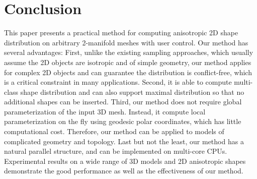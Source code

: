 \section{Conclusion}
  This paper presents a practical method for computing anisotropic 2D shape distribution on arbitrary 2-manifold meshes with user control.
  Our method has several advantages:
  First, unlike the existing sampling approaches, which usually assume the 2D objects are isotropic and of simple geometry,
  our method applies for complex 2D objects and can guarantee the distribution is conflict-free, which is a critical constraint in many applications.
  Second, it is able to compute multi-class shape distribution and can also support maximal distribution so that no additional shapes can be inserted.
  Third, our method does not require global parameterization of the input 3D mesh.
  Instead, it compute local parameterization on the fly using geodesic polar coordinates, which has little computational cost.
  Therefore, our method can be applied to models of complicated geometry and topology.
  Last but not the least, our method has a natural parallel structure, and can be implemented on multi-core CPUs.
  Experimental results on a wide range of 3D models and 2D anisotropic shapes demonstrate the good performance as well as the effectiveness of our method.


